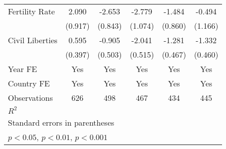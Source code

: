 \begin{table}[htbp]
\begin{tabular}{l*{5}{c}}
\addlinespace
Fertility Rate  &    2.090\sym{*}  &   -2.653\sym{**} &   -2.779\sym{**} &   -1.484         &   -0.494         \\
                &  (0.917)         &  (0.843)         &  (1.074)         &  (0.860)         &  (1.166)         \\
\addlinespace
Civil Liberties &    0.595         &   -0.905         &   -2.041\sym{***}&   -1.281\sym{**} &   -1.332\sym{**} \\
                &  (0.397)         &  (0.503)         &  (0.515)         &  (0.467)         &  (0.460)         \\
\addlinespace
Year FE         &      Yes         &      Yes         &      Yes         &      Yes         &      Yes         \\
\addlinespace
Country FE      &      Yes         &      Yes         &      Yes         &      Yes         &      Yes         \\
\midrule
Observations    &      626         &      498         &      467         &      434         &      445         \\
\(R^{2}\)       &                  &                  &                  &                  &                  \\
\bottomrule
\multicolumn{6}{l}{\footnotesize Standard errors in parentheses}\\
\multicolumn{6}{l}{\footnotesize \sym{*} \(p<0.05\), \sym{**} \(p<0.01\), \sym{***} \(p<0.001\)}\\
\end{tabular}
\end{table}
